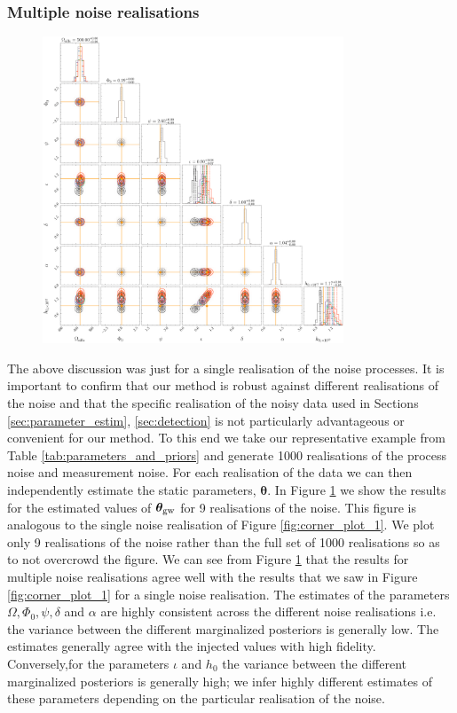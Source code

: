 \documentclass[fleqn,usenatbib,useAMS]{mnras}
\begin{document}
\subsubsection{Multiple noise realisations} \label{sec:multiple_noise}
\begin{figure}
	\includegraphics[width=0.8\textwidth, height =0.8\textwidth ]{images/stacked_GW_plot_1000}
	\caption{}
	\label{fig:corner_plot_2}
\end{figure}
The above discussion was just for a single realisation of the noise processes. It is important to confirm that our method is robust against different realisations of the noise and that the specific realisation of the noisy data used in Sections \ref{sec:parameter_estim}, \ref{sec:detection} is not particularly advantageous or convenient for our method. To this end we take our representative example from Table \ref{tab:parameters_and_priors} and generate 1000 realisations of the process noise and measurement noise. For each realisation of the data we can then independently estimate the static parameters, $\boldsymbol{\theta}$. In Figure \ref{fig:corner_plot_2} we show the results for the  estimated values of $\boldsymbol{\theta}_{\rm gw}$ for 9 realisations of the noise. This figure is analogous to the single noise realisation of Figure \ref{fig:corner_plot_1}. We plot only 9 realisations of the noise rather than the full set of 1000 realisations so as to not overcrowd the figure. We can see from Figure \ref{fig:corner_plot_2} that the results for multiple noise realisations agree well with the results that we saw in  Figure \ref{fig:corner_plot_1} for a single noise realisation. The estimates of the parameters $\Omega, \Phi_0, \psi, \delta$ and $\alpha$ are highly consistent across the different noise realisations i.e. the variance between the different marginalized posteriors is generally low. The estimates generally agree with the injected values with high fidelity. Conversely,for the parameters $\iota$ and $h_0$ the variance between the different marginalized posteriors is generally high; we infer highly different estimates of these parameters depending on the particular realisation of the noise. \newline 
 
\end{document}
